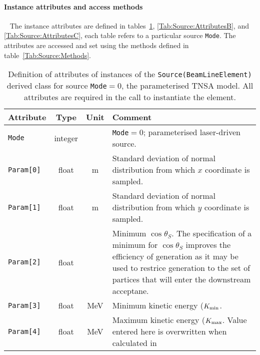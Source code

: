 \paragraph{Instance attributes and access methods} ~\newline
\label{SubSubSect:Source:InstAttr}
\noindent
The instance attributes are defined in
tables~\ref{Tab:Source:AttributesA}, \ref{Tab:Source:AttributesB},
and \ref{Tab:Source:AttributesC}, each table refers to a particular
source \texttt{Mode}.
The attributes are accessed and set using the methods defined in
table~\ref{Tab:Source:Methods}.
\begin{table}[h]
  \caption{
    Definition of attributes of instances of
    the \texttt{Source(BeamLineElement)} derived class for
    source \texttt{Mode}$=0$, the parameterised TNSA model.
    All attributes are required in the call to instantiate the
    element.
  }
  \label{Tab:Source:AttributesA}
  \begin{center}
    \begin{tabular}{|l|c|c|p{10cm}|}
      \hline
      \textbf{Attribute} & \textbf{Type}      & \textbf{Unit} & \textbf{Comment}                    \\
      \hline
      \texttt{Mode}      & integer &          & \texttt{Mode}$=0$; parameterised laser-driven source.        \\
      \hline
       \texttt{Param[0]} & float   & m        & Standard deviation of normal distribution from which $x$ coordinate is sampled. \\
       \texttt{Param[1]} & float   & m        & Standard deviation of normal distribution from which $y$ coordinate is sampled. \\
       \texttt{Param[2]} & float   &          & Minimum $\cos\theta_S$.
                                                The specification of a minimum for $\cos\theta_S$ improves the efficiency of
                                                generation as it may be used to restrice generation to the set of partices that
                                                will enter the downstream acceptane.                                            \\
       \texttt{Param[3]} & float   & MeV      & Minimum kinetic energy ($K_{\rm min}$.                                          \\
       \texttt{Param[4]} & float   & MeV      & Maximum kinetic energy ($K_{\rm max}$.
                                                Value entered here is overwritten when calculated in

\end{tabular}
\end{center}
\end{table}
